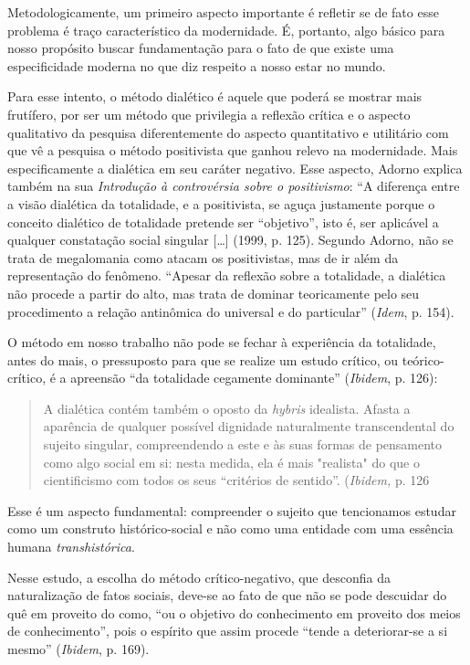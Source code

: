 Metodologicamente, um primeiro aspecto importante é refletir se de fato
esse problema é traço característico da modernidade. É, portanto, algo
básico para nosso propósito buscar fundamentação para o fato de que
existe uma especificidade moderna no que diz respeito a nosso estar no
mundo.

Para esse intento, o método dialético é aquele que poderá se mostrar
mais frutífero, por ser um método que privilegia a reflexão crítica e o
aspecto qualitativo da pesquisa diferentemente do aspecto quantitativo e
utilitário com que vê a pesquisa o método positivista que ganhou relevo
na modernidade. Mais especificamente a dialética em seu caráter
negativo. Esse aspecto, Adorno explica também na sua \emph{Introdução à
controvérsia sobre o positivismo}: ``A diferença entre a visão dialética
da totalidade, e a positivista, se aguça justamente porque o conceito
dialético de totalidade pretende ser ``objetivo'', isto é, ser aplicável
a qualquer constatação social singular {[}\ldots{}{]} (1999, p. 125).
Segundo Adorno, não se trata de megalomania como atacam os positivistas,
mas de ir além da representação do fenômeno. ``Apesar da reflexão sobre
a totalidade, a dialética não procede a partir do alto, mas trata de
dominar teoricamente pelo seu procedimento a relação antinômica do
universal e do particular'' (\emph{Idem}, p. 154).

O método em nosso trabalho não pode se fechar à experiência da
totalidade, antes do mais, o pressuposto para que se realize um estudo
crítico, ou teórico-crítico, é a apreensão ``da totalidade cegamente
dominante'' (\emph{Ibidem}, p. 126):

\begin{quote}
A dialética contém também o oposto da \emph{hybris} idealista. Afasta a
aparência de qualquer possível dignidade naturalmente transcendental do
sujeito singular, compreendendo a este e às suas formas de pensamento
como algo social em si: nesta medida, ela é mais "realista" do que o
cientificismo com todos os seus ``critérios de sentido''.
(\emph{Ibidem,} p. 126
\end{quote}

Esse é um aspecto fundamental: compreender o sujeito que tencionamos
estudar como um construto histórico-social e não como uma entidade com
uma essência humana \emph{transhistórica}.

Nesse estudo, a escolha do método crítico-negativo, que desconfia da
naturalização de fatos sociais, deve-se ao fato de que não se pode
descuidar do quê em proveito do como, ``ou o objetivo do conhecimento em
proveito dos meios de conhecimento'', pois o espírito que assim procede
``tende a deteriorar-se a si mesmo'' (\emph{Ibidem}, p. 169).

